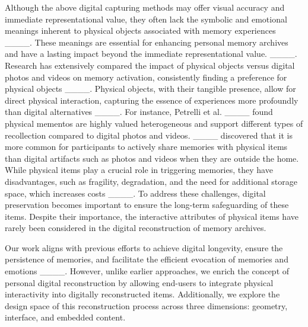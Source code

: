 Although the above digital capturing methods may offer visual accuracy and immediate representational value, they often lack the symbolic and emotional meanings inherent to physical objects associated with memory experiences ____.
These meanings are essential for enhancing personal memory archives and have a lasting impact beyond the immediate representational value. ____. 
Research has extensively compared the impact of physical objects versus digital photos and videos on memory activation, consistently finding a preference for physical objects ____. 
Physical objects, with their tangible presence, allow for direct physical interaction, capturing the essence of experiences more profoundly than digital alternatives ____.
For instance, Petrelli et al. ____ found physical mementos are highly valued heterogeneous and support different types of recollection compared to digital photos and videos.
____ discovered that it is more common for participants to actively share memories with physical items than digital artifacts such as photos and videos when they are outside the home. 
While physical items play a crucial role in triggering memories, they have disadvantages, such as fragility, degradation, and the need for additional storage space, which increases costs ____. 
To address these challenges, digital preservation becomes important to ensure the long-term safeguarding of these items. Despite their importance, the interactive attributes of physical items have rarely been considered in the digital reconstruction of memory archives.

Our work aligns with previous efforts to achieve digital longevity, ensure the persistence of memories, and facilitate the efficient evocation of memories and emotions ____. 
However, unlike earlier approaches, we enrich the concept of personal digital reconstruction by allowing end-users to integrate physical interactivity into digitally reconstructed items. Additionally, we explore the design space of this reconstruction process across three dimensions: geometry, interface, and embedded content.





